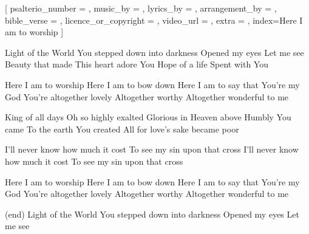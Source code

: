 
\repchoruses

[
	psalterio_number = {},
	music_by = {},    
	lyrics_by = {},
	arrangement_by = {},
	bible_verse  = {},
	licence_or_copyright = {},
	video_url = {},
	extra = {},
	index={Here I am to worship}
]



\beginverse
Light of the World
You stepped down into darkness
Opened my eyes
Let me see
Beauty that made
This heart adore You
Hope of a life
Spent with You
\endverse

\beginchorus
Here I am to worship
Here I am to bow down
Here I am to say that You're my God
You're altogether lovely
Altogether worthy
Altogether wonderful to me
\endchorus

\beginverse
King of all days
Oh so highly exalted
Glorious in Heaven above
Humbly You came
To the earth You created
All for love's sake became poor
\endverse                         

\beginverse
I'll never know how much it cost
To see my sin upon that cross
I'll never know how much it cost
To see my sin upon that cross \linebreak
\endverse   

\beginchorus
Here I am to worship
Here I am to bow down
Here I am to say that You're my God
You're altogether lovely
Altogether worthy
Altogether wonderful to me
\endchorus


\beginverse
(end)
Light of the World
You stepped down into darkness
Opened my eyes
Let me see
\endverse   


\norepchoruses

\endsong
